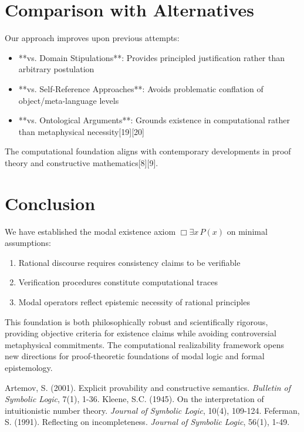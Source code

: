\documentclass[12pt]{article}
\begin{document}
\section{Comparison with Alternatives}

Our approach improves upon previous attempts:

\begin{itemize}
\item **vs. Domain Stipulations**: Provides principled justification rather than arbitrary postulation
\item **vs. Self-Reference Approaches**: Avoids problematic conflation of object/meta-language levels
\item **vs. Ontological Arguments**: Grounds existence in computational rather than metaphysical necessity[19][20]
\end{itemize}

The computational foundation aligns with contemporary developments in proof theory and constructive mathematics[8][9].

\section{Conclusion}

We have established the modal existence axiom $\Box\exists x\,P(x)$ on minimal assumptions:
\begin{enumerate}
\item Rational discourse requires consistency claims to be verifiable
\item Verification procedures constitute computational traces  
\item Modal operators reflect epistemic necessity of rational principles
\end{enumerate}

This foundation is both philosophically robust and scientifically rigorous, providing objective criteria for existence claims while avoiding controversial metaphysical commitments. The computational realizability framework opens new directions for proof-theoretic foundations of modal logic and formal epistemology.


\begin{thebibliography}{99}
 Artemov, S. (2001). Explicit provability and constructive semantics. \emph{Bulletin of Symbolic Logic}, 7(1), 1-36.
 Kleene, S.C. (1945). On the interpretation of intuitionistic number theory. \emph{Journal of Symbolic Logic}, 10(4), 109-124.
 Feferman, S. (1991). Reflecting on incompleteness. \emph{Journal of Symbolic Logic}, 56(1), 1-49.
\end{thebibliography}
\end{document}
